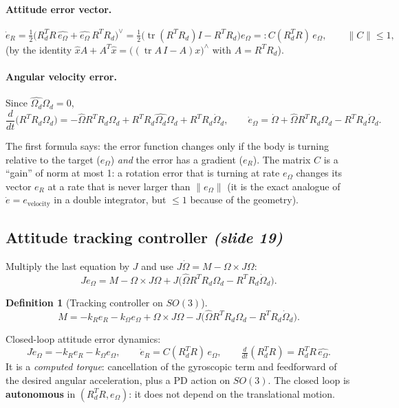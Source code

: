 \documentclass[11pt,a4paper]{article}
\newcommand{\tr}{\operatorname{tr}}
\newcommand{\hatm}[1]{\widehat{#1}}          %
\newcommand{\VEE}{^{\vee}}
\newcommand{\eR}{e_R}
\newcommand{\eO}{e_\Omega}
\newcommand{\Od}{\Omega_d}
\newcommand{\sli}[1]{\emph{(#1)}}
\theoremstyle{definition}
\newtheorem{definition}{Definition}[section]
\theoremstyle{plain}
\theoremstyle{remark}
\begin{document}
\paragraph{Attitude error vector.}
\[
\dot\eR=\tfrac12\big(R_d^TR\,\hatm{\eO}+\hatm{\eO}\,R^TR_d\big)\VEE=\tfrac12\big(\tr(R^TR_d)I-R^TR_d\big)\eO=:C(R_d^TR)\,\eO,\qquad\|C\|\le1,
\]
(by the identity $\hatm xA+A^T\hatm x=\big((\tr A\,I-A)x\big)^\wedge$ with $A=R^TR_d$).

\paragraph{Angular velocity error.} Since $\hatm\Od\Od=0$,
\[
\frac d{dt}\big(R^TR_d\Od\big)=-\hatm\Omega R^TR_d\Od+R^TR_d\hatm\Od\Od+R^TR_d\dot\Omega_d,
\qquad
\dot\eO=\dot\Omega+\hatm\Omega R^TR_d\Od-R^TR_d\dot\Omega_d .
\]

\begin{intuition}
The first formula says: the error function changes only if the body is turning relative to the target ($\eO$) \emph{and} the error has a gradient ($\eR$). The matrix $C$ is a ``gain'' of norm at most 1: a rotation error that is turning at rate $\eO$ changes its vector $\eR$ at a rate that is never larger than $\|\eO\|$ (it is the exact analogue of $\dot e=e_{\text{velocity}}$ in a double integrator, but $\le1$ because of the geometry).
\end{intuition}

\subsection{Attitude tracking controller \sli{slide 19}}

Multiply the last equation by $J$ and use $J\dot\Omega=M-\Omega\times J\Omega$:
\[
J\dot\eO=M-\Omega\times J\Omega+J\big(\hatm\Omega R^TR_d\Od-R^TR_d\dot\Omega_d\big).
\]

\begin{definition}[Tracking controller on $SO(3)$]
\[
M=-k_R\eR-k_\Omega\eO+\Omega\times J\Omega-J\big(\hatm\Omega R^TR_d\Od-R^TR_d\dot\Omega_d\big).
\]
\end{definition}

Closed-loop attitude error dynamics:
\[
J\dot\eO=-k_R\eR-k_\Omega\eO,\qquad\dot\eR=C(R_d^TR)\,\eO,\qquad \tfrac d{dt}(R_d^TR)=R_d^TR\,\hatm{\eO}.
\]
It is a \emph{computed torque}: cancellation of the gyroscopic term and feedforward of the desired angular acceleration, plus a PD action on $SO(3)$. The closed loop is \textbf{autonomous} in $(R_d^TR,\eO)$: it does not depend on the translational motion.
\end{document}

